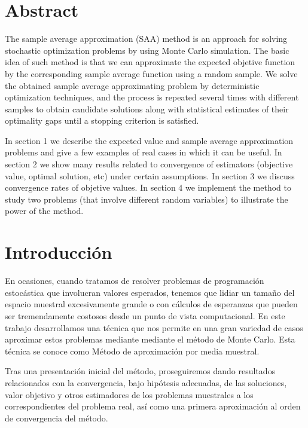 \documentclass[twoside,a4paper,openright,12pt]{book}
\begin{document}
\newpage
\thispagestyle{empty}

\tableofcontents
\newpage
\thispagestyle{empty}

\chapter*{Abstract}
The sample average approximation (SAA) method is an approach for solving stochastic optimization problems by using Monte Carlo simulation. The basic idea of such method is that we can approximate the expected objetive function by the corresponding sample average function using a random sample. We solve the obtained sample average approximating problem by deterministic optimization techniques, and the process is repeated several times with different samples to obtain candidate solutions along with statistical estimates of their optimality gaps until a stopping criterion is satisfied.


In section 1 we describe the expected value and sample average approximation problems and give a few examples of real cases in which it can be useful. In section 2 we show many results related to convergence of estimators (objective value, optimal solution, etc) under certain assumptions. In section 3  we discuss convergence rates of objetive values. In section 4 we implement the method to study two problems (that involve different random variables) to illustrate the power of the method.
\newpage
\thispagestyle{empty}

\chapter*{Introducci\'on}\label{cap.introduccion}
En ocasiones, cuando tratamos de resolver problemas de programación estocástica que involucran valores esperados, tenemos que lidiar un tamaño del espacio muestral excesivamente grande o con cálculos de esperanzas que pueden ser tremendamente costosos desde un punto de vista computacional. En este trabajo desarrollamos una técnica que nos permite en una gran variedad de casos aproximar estos problemas mediante mediante el método de Monte Carlo. Esta técnica se conoce como Método de aproximación por media muestral.

Tras una presentación inicial del método, proseguiremos dando resultados relacionados con la convergencia, bajo hipótesis adecuadas, de las soluciones, valor objetivo y otros estimadores de los problemas muestrales a los correspondientes del problema real, así como una primera aproximación al orden de convergencia del método. 
\end{document}
